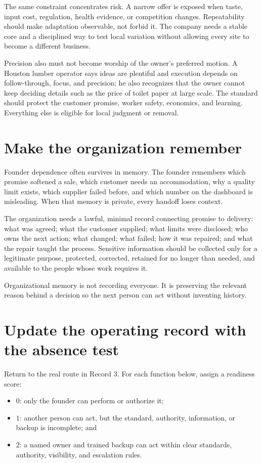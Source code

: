 The same constraint concentrates risk. A narrow offer is exposed when taste,
input cost, regulation, health evidence, or competition changes. Repeatability
should make adaptation observable, not forbid it. The company needs a stable
core and a disciplined way to test local variation without allowing every site
to become a different business.

Precision also must not become worship of the owner's preferred motion. A
Houston lumber operator says ideas are plentiful and execution depends on
follow-through, focus, and precision; he also recognizes that the owner cannot
keep deciding details such as the price of toilet paper at large scale. The
standard should protect the customer promise, worker safety, economics, and
learning. Everything else is eligible for local judgment or removal.

\section{Make the organization remember}

Founder dependence often survives in memory. The founder remembers which
promise softened a sale, which customer needs an accommodation, why a quality
limit exists, which supplier failed before, and which number on the dashboard
is misleading. When that memory is private, every handoff loses context.

The organization needs a lawful, minimal record connecting promise to delivery:
what was agreed; what the customer supplied; what limits were disclosed; who
owns the next action; what changed; what failed; how it was repaired; and what
the repair taught the process. Sensitive information should be collected only
for a legitimate purpose, protected, corrected, retained for no longer than
needed, and available to the people whose work requires it.

Organizational memory is not recording everyone. It is preserving the relevant
reason behind a decision so the next person can act without inventing history.

\section{Update the operating record with the absence test}

Return to the real route in Record 3. For each function below, assign a readiness
score:

\begin{itemize}[leftmargin=1.5em,itemsep=0.15em]
\item \(0\): only the founder can perform or authorize it;
\item \(1\): another person can act, but the standard, authority, information,
  or backup is incomplete; and
\item \(2\): a named owner and trained backup can act within clear standards,
  authority, visibility, and escalation rules.
\end{itemize}

